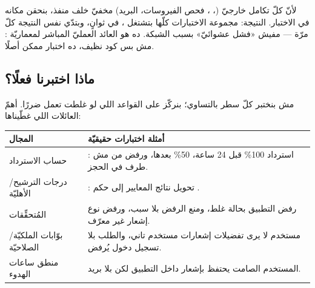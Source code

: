 \begin{center}\begin{LTR}
\end{LTR}\end{center}

\begin{spotlight}
لأنّ كلّ تكامل خارجيّ (، ، فحص الفيروسات، البريد) مخفيّ خلف منفذ، بنحقن مكانه  في الاختبار. النتيجة: مجموعة الاختبارات كلّها بتشتغل ، في ثوانٍ، وبتدّي نفس النتيجة كلّ مرّة — مفيش «فشل عشوائيّ» بسبب الشبكة. ده هو العائد العمليّ المباشر لمعماريّة : مش بس كود نظيف، ده اختبار ممكن أصلًا.
\end{spotlight}

\subsection{ماذا اختبرنا فعلًا؟}

مش بنختبر كلّ سطر بالتساوي؛ بنركّز على القواعد اللي لو غلطت تعمل ضررًا. أهمّ العائلات اللي غطّيناها:

\begin{center}
\begin{tabular}{L{4cm} L{8.4cm}}
\toprule
المجال & أمثلة اختبارات حقيقيّة \\
\midrule
حساب الاسترداد & : استرداد \textenglish{100}\% قبل \textenglish{24} ساعة، \textenglish{50}\% بعدها، ورفض من مش طرف في الحجز. \\
درجات الترشيح/الأهليّة & : تحويل نتائج المعايير إلى حكم . \\
المُتحقِّقات  & رفض التطبيق بحالة غلط، ومنع الرفض بلا سبب، ورفض نوع إشعار غير معرّف. \\
بوّابات الملكيّة/الصلاحيّة & مستخدم لا يرى تفضيلات إشعارات مستخدم تاني، والطلب بلا تسجيل دخول يُرفض. \\
منطق ساعات الهدوء  & المستخدم الصامت يحتفظ بإشعار داخل التطبيق لكن بلا بريد. \\
\bottomrule
\end{tabular}
\end{center}

